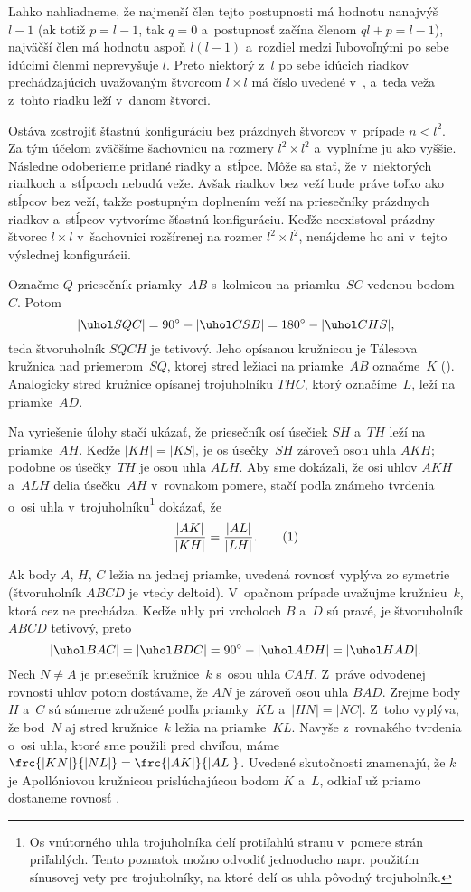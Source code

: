 {Ľahko nahliadneme, že najmenší člen tejto postupnosti má hodnotu nanajvýš $l-1$ (ak totiž $p=l-1$, tak $q=0$ a~postupnosť začína členom $ql+p=l-1$), najväčší člen má hodnotu aspoň $l(l-1)$ a~rozdiel medzi ľubovoľnými po sebe idúcimi členmi neprevyšuje $l$. Preto niektorý z~$l$ po sebe idúcich riadkov prechádzajúcich uvažovaným štvorcom $l\times l$ má číslo uvedené v~, a~teda veža z~tohto riadku leží v~danom štvorci.

Ostáva zostrojiť šťastnú konfiguráciu bez prázdnych štvorcov v~prípade $n < l^2$. Za tým účelom zväčšíme šachovnicu na rozmery $l^2 \times l^2$ a~vyplníme ju ako vyššie. Následne odoberieme pridané riadky a~stĺpce. Môže sa stať, že v~niektorých riadkoch a~stĺpcoch nebudú veže. Avšak riadkov bez veží bude práve toľko ako stĺpcov bez veží, takže postupným doplnením veží na priesečníky prázdnych riadkov a~stĺpcov vytvoríme šťastnú konfiguráciu. Keďže neexistoval prázdny štvorec $l\times l$ v~šachovnici rozšírenej na rozmer $l^2 \times l^2$, nenájdeme ho ani v~tejto výslednej konfigurácii.
}

{%
Označme $Q$ priesečník priamky~$AB$ s~kolmicou na priamku~$SC$ vedenou bodom~$C$. Potom
$$
|\uhol SQC| = 90^{\circ} - |\uhol CSB| = 180^{\circ} - |\uhol CHS|,
$$
teda štvoruholník $SQCH$ je tetivový. Jeho opísanou kružnicou je Tálesova kružnica nad priemerom~$SQ$, ktorej stred ležiaci na priamke~$AB$ označme~$K$ (\obr). Analogicky stred kružnice opísanej trojuholníku $THC$, ktorý označíme~$L$, leží na priamke~$AD$.

Na vyriešenie úlohy stačí ukázať, že priesečník osí úsečiek $SH$ a~$TH$ leží na priamke~$AH$. Keďže $|KH|=|KS|$, je os úsečky~$SH$ zároveň osou uhla $AKH$; podobne os úsečky~$TH$ je osou uhla $ALH$. Aby sme dokázali, že osi uhlov $AKH$ a~$ALH$ delia úsečku~$AH$ v~rovnakom pomere, stačí podľa známeho tvrdenia o~osi uhla v~trojuholníku\footnote{Os vnútorného uhla trojuholníka delí protiľahlú stranu v~pomere strán priľahlých. Tento poznatok možno odvodiť jednoducho napr. použitím sínusovej vety pre trojuholníky, na ktoré delí os uhla pôvodný trojuholník.} dokázať, že
$$
\frac{|AK|}{|KH|} = \frac{|AL|}{|LH|}.
\tag1
$$
%

Ak body $A$, $H$, $C$ ležia na jednej priamke, uvedená rovnosť vyplýva zo symetrie (štvoruholník $ABCD$ je vtedy deltoid). V~opačnom prípade uvažujme kružnicu~$k$, ktorá cez ne prechádza. Keďže uhly pri vrcholoch $B$ a~$D$ sú pravé, je štvoruholník $ABCD$ tetivový, preto
$$
|\uhol BAC| = |\uhol BDC| = 90^{\circ} - |\uhol ADH| = |\uhol HAD|.
$$
Nech $N\ne A$ je priesečník kružnice~$k$ s~osou uhla $CAH$. Z~práve odvodenej rovnosti uhlov potom dostávame, že $AN$ je zároveň osou uhla $BAD$.
Zrejme body $H$ a~$C$ sú súmerne združené podľa priamky~$KL$ a~$|HN|=|NC|$. Z~toho vyplýva, že bod~$N$ aj stred kružnice~$k$ ležia na priamke~$KL$.
Navyše z~rovnakého tvrdenia o~osi uhla, ktoré sme použili pred chvíľou, máme $\frc{|KN|}{|NL|} = \frc{|AK|}{|AL|}$. Uvedené skutočnosti znamenajú, že $k$ je Apollóniovou kružnicou prislúchajúcou bodom $K$ a~$L$, odkiaľ už priamo dostaneme rovnosť .
}


